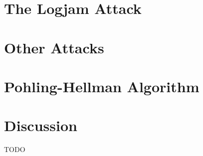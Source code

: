 \documentclass[paper=a4, fontsize=11pt]{scrartcl} %
\numberwithin{equation}{section} %
\numberwithin{figure}{section} %
\numberwithin{table}{section} %
\begin{document}
\section{The Logjam Attack}



\section{Other Attacks}

\section{Pohling-Hellman Algorithm}

\section{Discussion}
TODO

\newpage


\end{document}
